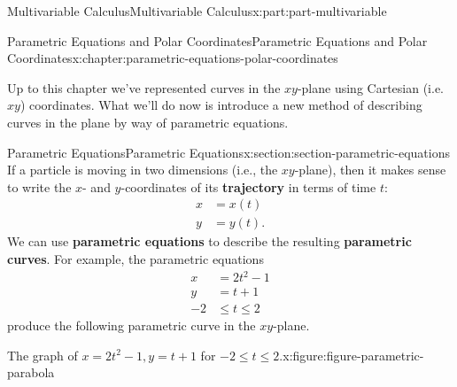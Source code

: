\documentclass[twoside,10pt,]{tufte-book}
\newcommand{\terminology}[1]{\textbf{#1}}
\numberwithin{equation}{part}
\newcommand{\amp}{&}
\begin{document}
\begin{partptx}{Multivariable Calculus}{}{Multivariable Calculus}{}{}{x:part:part-multivariable}
%
\typeout{************************************************}
\typeout{************************************************}
%
\begin{chapterptx}{Parametric Equations and Polar Coordinates}{}{Parametric Equations and Polar Coordinates}{}{}{x:chapter:parametric-equations-polar-coordinates}
\begin{introduction}{}%
Up to this chapter we've represented curves in the \(xy\)-plane using Cartesian (i.e. \(xy\)) coordinates. What we'll do now is introduce a new method of describing curves in the plane by way of parametric equations.%
\end{introduction}%
%
%
\typeout{************************************************}
\typeout{************************************************}
%
\begin{sectionptx}{Parametric Equations}{}{Parametric Equations}{}{}{x:section:section-parametric-equations}
If a particle is moving in two dimensions (i.e., the \(xy\)-plane), then it makes sense to write the \(x\)- and \(y\)-coordinates of its \terminology{trajectory} in terms of time \(t\):%
\begin{align*}
x \amp = x(t) \\
y \amp = y(t) \text{.}
\end{align*}
We can use \terminology{parametric equations} to describe the resulting \terminology{parametric curves}. For example, the parametric equations%
%
\begin{align*}
x \amp = 2t^{2}-1 \\
y \amp = t+1 \\
-2 \amp \leq t\leq 2 
\end{align*}
produce the following parametric curve in the \(xy\)-plane.%
\begin{figureptx}{The graph of \(x = 2t^2-1, y=t+1\) for \(-2\leq t\leq 2\).}{x:figure:figure-parametric-parabola}{}%
\begin{image}{0}{1}{0}%
\end{image}
\end{figureptx}
\end{sectionptx}
\end{chapterptx}
\end{partptx}
\end{document}
